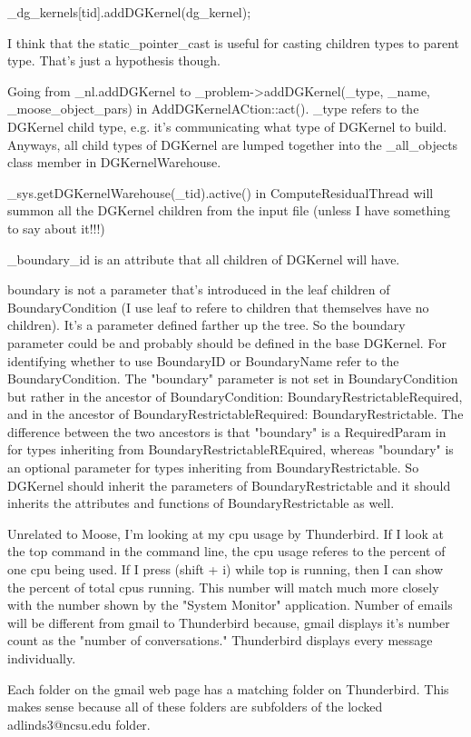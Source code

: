 {    _dg_kernels[tid].addDGKernel(dg_kernel);

I think that the static_pointer_cast is useful for casting children types to parent type. That's just a hypothesis though.

Going from _nl.addDGKernel to _problem->addDGKernel(_type, _name, _moose_object_pars) in AddDGKernelACtion::act(). _type refers to the DGKernel child type, e.g. it's communicating what type of DGKernel to build. Anyways, all child types of DGKernel are lumped together into the _all_objects class member in DGKernelWarehouse.

_sys.getDGKernelWarehouse(_tid).active() in ComputeResidualThread will summon all the DGKernel children from the input file (unless I have something to say about it!!!)

_boundary_id is an attribute that all children of DGKernel will have.

boundary is not a parameter that's introduced in the leaf children of BoundaryCondition (I use leaf to refere to children that themselves have no children). It's a parameter defined farther up the tree. So the boundary parameter could be and probably should be defined in the base DGKernel. For identifying whether to use BoundaryID or BoundaryName refer to the BoundaryCondition. The "boundary" parameter is not set in BoundaryCondition but rather in the ancestor of BoundaryCondition: BoundaryRestrictableRequired, and in the ancestor of BoundaryRestrictableRequired: BoundaryRestrictable. The difference between the two ancestors is that "boundary" is a RequiredParam in for types inheriting from BoundaryRestrictableREquired, whereas "boundary" is an optional parameter for types inheriting from BoundaryRestrictable. So DGKernel should inherit the parameters of BoundaryRestrictable and it should inherits the attributes and functions of BoundaryRestrictable as well.

Unrelated to Moose, I'm looking at my cpu usage by Thunderbird. If I look at the top command in the command line, the cpu usage referes to the percent of one cpu being used. If I press (shift + i) while top is running, then I can show the percent of total cpus running. This number will match much more closely with the number shown by the "System Monitor" application. Number of emails will be different from gmail to Thunderbird because, gmail displays it's number count as the "number of conversations." Thunderbird displays every message individually.

Each folder on the gmail web page has a matching folder on Thunderbird. This makes sense because all of these folders are subfolders of the locked adlinds3@ncsu.edu folder.

}
